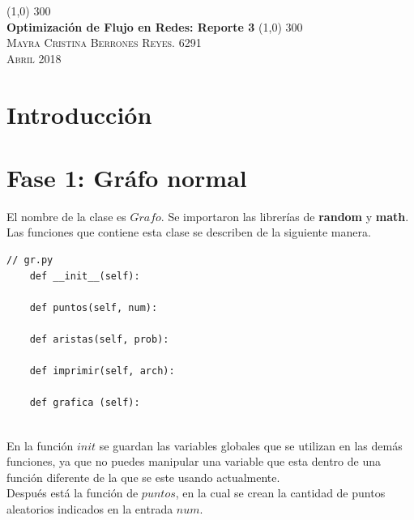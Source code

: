 \documentclass{article}%
\begin{document}
\begin{titlepage}
	\begin{center}
	\line(1,0) {300} \\
	\huge{\textbf{Optimizaci\'on de Flujo en Redes: Reporte 3 }}
	\line(1,0) {300}\\
	
	\textsc{ \Large Mayra Cristina Berrones Reyes.  6291}\\ 
	\textsc{\Large Abril 2018} \\
	\end{center}
\end{titlepage}

\section*{Introducci\'on}



\begin{description}[font=$\bullet$~\normalfont\scshape\color{black}]
\item[\textbf{Floyd Warshall } ]
\item[\textbf{Ford Fulkerson} ]

\end{description}

\section*{Fase 1: Gr\'afo normal}

El nombre de la clase es $Grafo$. Se importaron las librer\'ias de \textbf{random} y \textbf{math}. Las funciones que contiene esta clase se describen de la siguiente manera.

\begin{lstlisting}
// gr.py
	def __init__(self):

	def puntos(self, num):

	def aristas(self, prob):
	
	def imprimir(self, arch):
	
	def grafica (self):
	
\end{lstlisting}

En la funci\'on $init$ se guardan las variables globales que se utilizan en las dem\'as funciones, ya que no puedes manipular una variable que esta dentro de una funci\'on diferente de la que se este usando actualmente.
\\

Despu\'es est\'a la funci\'on de $puntos$, en la cual se crean la cantidad de puntos aleatorios indicados en la entrada $num$.
\\
\end{document}
